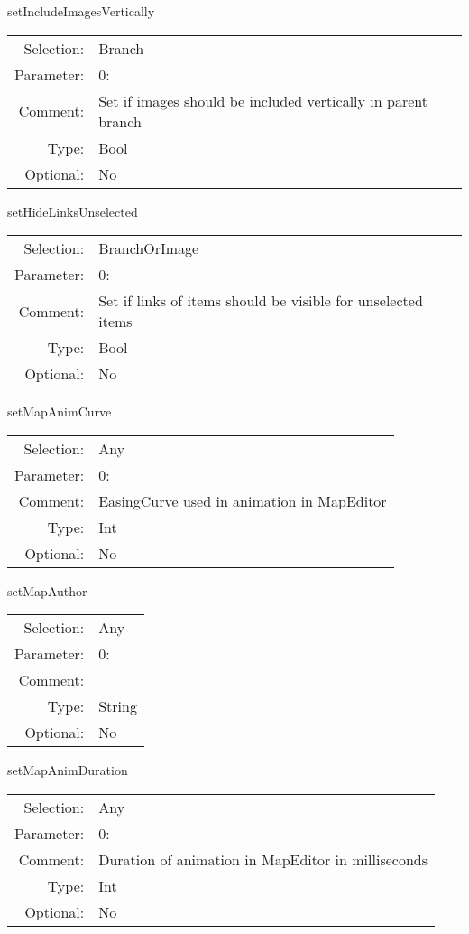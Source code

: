 \item setIncludeImagesVertically\\
\begin{tabular}{rl}
  Selection: & Branch\\
   Parameter: &  0:\\
        Comment: & Set if images should be included vertically in parent branch\\
           Type: & Bool\\
       Optional: &  No\\
\end{tabular}

\item setHideLinksUnselected\\
\begin{tabular}{rl}
  Selection: & BranchOrImage\\
   Parameter: &  0:\\
        Comment: & Set if links of items should be visible for unselected items\\
           Type: & Bool\\
       Optional: &  No\\
\end{tabular}

\item setMapAnimCurve\\
\begin{tabular}{rl}
  Selection: & Any\\
   Parameter: &  0:\\
        Comment: & EasingCurve used in animation in MapEditor\\
           Type: & Int\\
       Optional: &  No\\
\end{tabular}

\item setMapAuthor\\
\begin{tabular}{rl}
  Selection: & Any\\
   Parameter: &  0:\\
        Comment: & \\
           Type: & String\\
       Optional: &  No\\
\end{tabular}

\item setMapAnimDuration\\
\begin{tabular}{rl}
  Selection: & Any\\
   Parameter: &  0:\\
        Comment: & Duration of animation in MapEditor in milliseconds\\
           Type: & Int\\
       Optional: &  No\\
\end{tabular}


